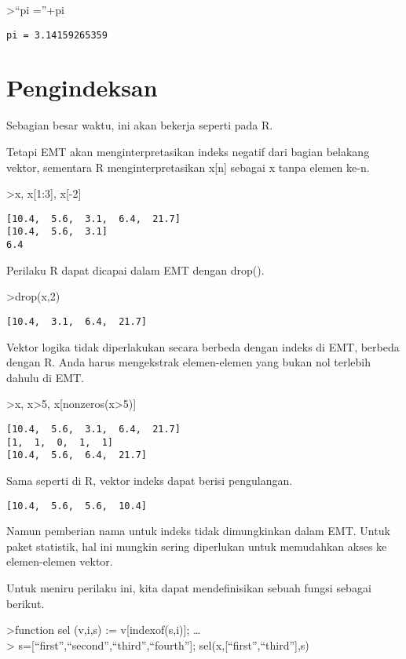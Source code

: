 \documentclass[
]{book}
\begin{document}
\textgreater{}``pi =''+pi

\begin{verbatim}
pi = 3.14159265359
\end{verbatim}

\chapter{Pengindeksan}\label{pengindeksan}

Sebagian besar waktu, ini akan bekerja seperti pada R.

Tetapi EMT akan menginterpretasikan indeks negatif dari bagian belakang vektor, sementara R menginterpretasikan x{[}n{]} sebagai x tanpa elemen ke-n.

\textgreater x, x{[}1:3{]}, x{[}-2{]}

\begin{verbatim}
[10.4,  5.6,  3.1,  6.4,  21.7]
[10.4,  5.6,  3.1]
6.4
\end{verbatim}

Perilaku R dapat dicapai dalam EMT dengan drop().

\textgreater drop(x,2)

\begin{verbatim}
[10.4,  3.1,  6.4,  21.7]
\end{verbatim}

Vektor logika tidak diperlakukan secara berbeda dengan indeks di EMT, berbeda dengan R. Anda harus mengekstrak elemen-elemen yang bukan nol terlebih dahulu di EMT.

\textgreater x, x\textgreater5, x{[}nonzeros(x\textgreater5){]}

\begin{verbatim}
[10.4,  5.6,  3.1,  6.4,  21.7]
[1,  1,  0,  1,  1]
[10.4,  5.6,  6.4,  21.7]
\end{verbatim}

Sama seperti di R, vektor indeks dapat berisi pengulangan.

\begin{verbatim}
[10.4,  5.6,  5.6,  10.4]
\end{verbatim}

Namun pemberian nama untuk indeks tidak dimungkinkan dalam EMT. Untuk paket statistik, hal ini mungkin sering diperlukan untuk memudahkan akses ke elemen-elemen vektor.

Untuk meniru perilaku ini, kita dapat mendefinisikan sebuah fungsi sebagai berikut.

\textgreater function sel (v,i,s) := v{[}indexof(s,i){]}; \ldots{}\\
\textgreater{} s={[}``first'',``second'',``third'',``fourth''{]}; sel(x,{[}``first'',``third''{]},s)
\end{document}
